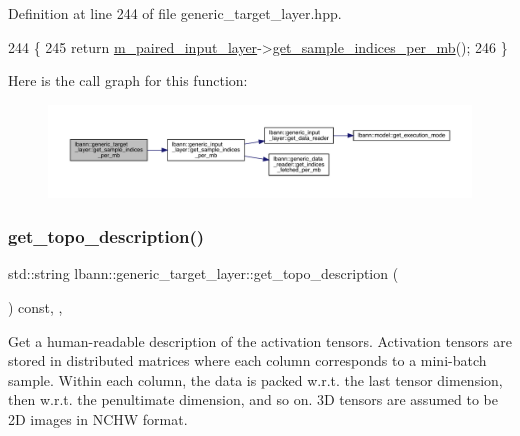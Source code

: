 Definition at line 244 of file generic\+\_\+target\+\_\+layer.\+hpp.


\begin{DoxyCode}
244                                                         \{
245     \textcolor{keywordflow}{return} \hyperlink{classlbann_1_1generic__target__layer_a84da1260e9feb4fbc3e6f2315e4cab4b}{m\_paired\_input\_layer}->\hyperlink{classlbann_1_1generic__input__layer_a749741781204b17c8ca172a9a405a90e}{get\_sample\_indices\_per\_mb}();
246   \}
\end{DoxyCode}
Here is the call graph for this function\+:\nopagebreak
\begin{figure}[H]
\begin{center}
\leavevmode
\includegraphics[width=350pt]{classlbann_1_1generic__target__layer_a9673d3fb3db6ecaae979886178b785ea_cgraph}
\end{center}
\end{figure}
\mbox{\label{classlbann_1_1generic__target__layer_ad6ea9a43254664c75aa06e8e5c1d7e8c}} 
\subsubsection{\texorpdfstring{get\+\_\+topo\+\_\+description()}{get\_topo\_description()}}
{\footnotesize\ttfamily std\+::string lbann\+::generic\+\_\+target\+\_\+layer\+::get\+\_\+topo\+\_\+description (\begin{DoxyParamCaption}{ }\end{DoxyParamCaption}) const\hspace{0.3cm}{\ttfamily [inline]}, {\ttfamily [override]}, {\ttfamily [virtual]}}

Get a human-\/readable description of the activation tensors. Activation tensors are stored in distributed matrices where each column corresponds to a mini-\/batch sample. Within each column, the data is packed w.\+r.\+t. the last tensor dimension, then w.\+r.\+t. the penultimate dimension, and so on. 3D tensors are assumed to be 2D images in N\+C\+HW format. 

